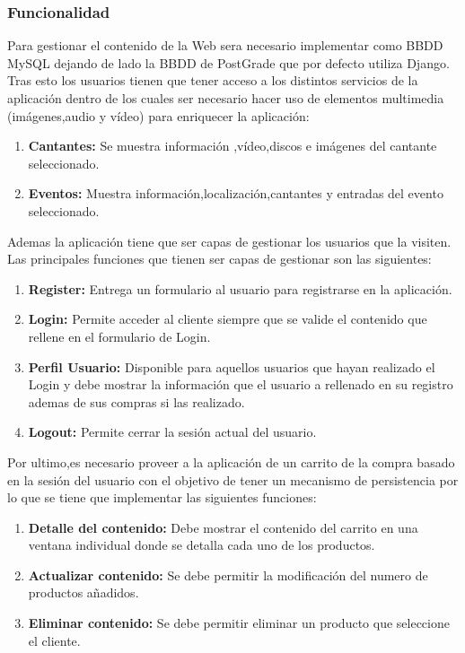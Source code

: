 \subsubsection*{Funcionalidad}
Para gestionar el contenido de la Web sera necesario implementar como BBDD MySQL dejando de lado la BBDD de PostGrade que por defecto utiliza Django.
\\Tras esto los usuarios tienen que tener acceso a los distintos servicios de la aplicación dentro de los cuales ser necesario hacer uso de elementos multimedia (imágenes,audio y vídeo) para enriquecer la aplicación:
\begin{enumerate}
  \item \textbf{Cantantes:} Se muestra información ,vídeo,discos e imágenes del cantante seleccionado.
  \item \textbf{Eventos:} Muestra información,localización,cantantes y entradas del evento seleccionado.
\end{enumerate}
Ademas la aplicación tiene que ser capas de gestionar los usuarios que la visiten. Las principales funciones que tienen ser capas de gestionar son las siguientes:
\begin{enumerate}
  \item \textbf{Register:} Entrega un formulario al usuario para registrarse en la aplicación.
  \item \textbf{Login:} Permite acceder al cliente siempre que se valide el contenido que rellene en el formulario de Login.
  \item \textbf{Perfil Usuario:} Disponible para aquellos usuarios que hayan realizado el Login y debe mostrar la información que el usuario a rellenado en su registro ademas de sus compras si las realizado.
  \item \textbf{Logout:} Permite cerrar la sesión actual del usuario.
\end{enumerate}
Por ultimo,es necesario proveer a la aplicación de un carrito de la compra basado en la sesión del usuario con el objetivo de tener un mecanismo de persistencia por lo que se tiene que implementar las siguientes funciones:
\begin{enumerate}
  \item \textbf{Detalle del contenido:} Debe mostrar el contenido del carrito en una ventana individual  donde se detalla cada uno de los productos.
  \item \textbf{Actualizar contenido:} Se debe permitir la modificación del numero de productos añadidos.
  \item \textbf{Eliminar contenido:} Se debe permitir eliminar un producto que seleccione el cliente.
\end{enumerate}
